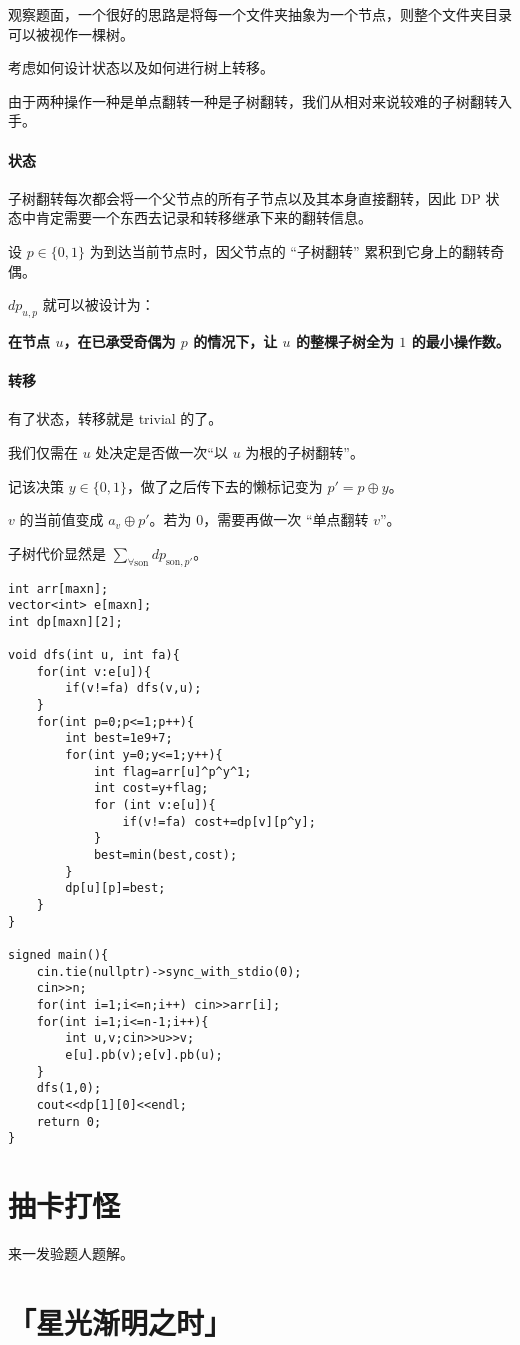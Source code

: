 \documentclass[14pt,a4paper]{article}
\begin{document}
观察题面，一个很好的思路是将每一个文件夹抽象为一个节点，则整个文件夹目录可以被视作一棵树。

考虑如何设计状态以及如何进行树上转移。

由于两种操作一种是单点翻转一种是子树翻转，我们从相对来说较难的子树翻转入手。

\paragraph{状态}
子树翻转每次都会将一个父节点的所有子节点以及其本身直接翻转，因此 DP 状态中肯定需要一个东西去记录和转移继承下来的翻转信息。

设 $p\in\{0,1\}$ 为到达当前节点时，因父节点的 “子树翻转” 累积到它身上的翻转奇偶。

$dp_{u,p}$ 就可以被设计为：

\textbf{在节点 $u$，在已承受奇偶为 $p$ 的情况下，让 $u$ 的整棵子树全为 $1$ 的最小操作数。}

\paragraph{转移}
有了状态，转移就是 trivial 的了。

我们仅需在 $u$ 处决定是否做一次“以 $u$ 为根的子树翻转”。

记该决策 $y\in\{0,1\}$，做了之后传下去的懒标记变为 $p' = p\oplus y$。

$v$ 的当前值变成 $a_v\oplus p'$。若为 $0$，需要再做一次 “单点翻转 $v$”。

子树代价显然是 $\sum_{\forall \text{son}} dp_{\text{son},p'}$。

\begin{verbatim}
int arr[maxn];
vector<int> e[maxn];
int dp[maxn][2];

void dfs(int u, int fa){
    for(int v:e[u]){
        if(v!=fa) dfs(v,u);
    }
    for(int p=0;p<=1;p++){
        int best=1e9+7;
        for(int y=0;y<=1;y++){
            int flag=arr[u]^p^y^1;
            int cost=y+flag;
            for (int v:e[u]){
                if(v!=fa) cost+=dp[v][p^y];
            }
            best=min(best,cost);
        }
        dp[u][p]=best;
    }
}

signed main(){
    cin.tie(nullptr)->sync_with_stdio(0);
    cin>>n;
    for(int i=1;i<=n;i++) cin>>arr[i];
    for(int i=1;i<=n-1;i++){
        int u,v;cin>>u>>v;
        e[u].pb(v);e[v].pb(u);
    }
    dfs(1,0);
    cout<<dp[1][0]<<endl;
    return 0;
}
\end{verbatim}

\section{抽卡打怪}
来一发验题人题解。

\section{「星光渐明之时」}
\end{document}
